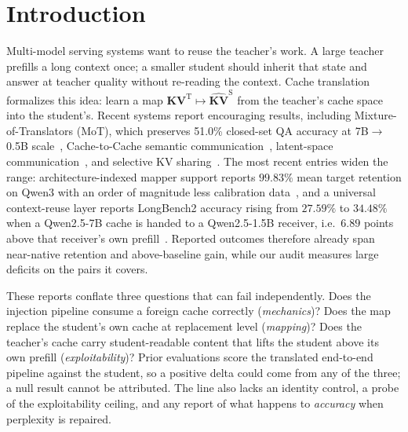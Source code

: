 \documentclass[10pt]{article}
\begin{document}
\section{Introduction}
\label{sec:intro}

Multi-model serving systems want to reuse the teacher's work. A large teacher
prefills a long context once; a smaller student should inherit that state and
answer at teacher quality without re-reading the context. Cache translation
formalizes this idea: learn a map $\mathbf{KV}^{\mathrm{T}} \mapsto
\widehat{\mathbf{KV}}^{\mathrm{S}}$ from the teacher's cache space into the
student's. Recent systems report encouraging results, including
Mixture-of-Translators (MoT), which preserves 51.0\% closed-set QA accuracy at
7B$\to$0.5B scale~\citep{mot2026}, Cache-to-Cache semantic
communication~\citep{c2c2025}, latent-space
communication~\citep{lsc2026}, and selective KV
sharing~\citep{kvcomm2025}. The most recent entries widen the range:
architecture-indexed mapper support reports $99.83\%$ mean target retention on
Qwen3 with an order of magnitude less calibration
data~\citep{cachebridge2026}, and a universal context-reuse layer reports
LongBench2 accuracy rising from $27.59\%$ to $34.48\%$ when a Qwen2.5-7B cache
is handed to a Qwen2.5-1.5B receiver, i.e.\ $6.89$ points above that
receiver's own prefill~\citep{contextreuse2026}. Reported outcomes therefore
already span near-native retention and above-baseline gain, while our audit
measures large deficits on the pairs it covers.

These reports conflate three questions that can fail independently. Does the
injection pipeline consume a foreign cache correctly (\emph{mechanics})? Does
the map replace the student's own cache at replacement level (\emph{mapping})?
Does the teacher's cache carry student-readable content that lifts the student
above its own prefill (\emph{exploitability})? Prior evaluations score the
translated end-to-end pipeline against the student, so a positive delta could
come from any of the three; a null result cannot be attributed. The line also
lacks an identity control, a probe of the exploitability ceiling, and any
report of what happens to \emph{accuracy} when perplexity is repaired.
\end{document}
